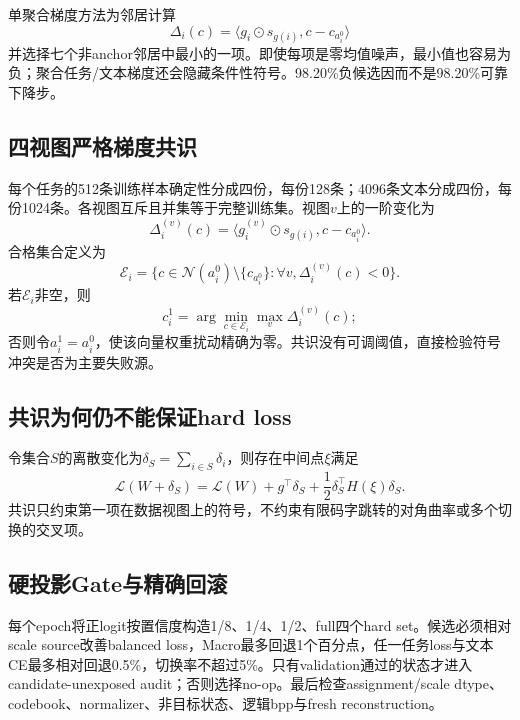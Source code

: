 单聚合梯度方法为邻居计算
\begin{equation}
\Delta_i(c)=\langle g_i\odot s_{g(i)},c-c_{a_i^0}\rangle
\end{equation}
并选择七个非anchor邻居中最小的一项。即使每项是零均值噪声，最小值也容易为负；聚合任务/文本梯度还会隐藏条件性符号。98.20\%负候选因而不是98.20\%可靠下降步。

\subsection{四视图严格梯度共识}

每个任务的512条训练样本确定性分成四份，每份128条；4096条文本分成四份，每份1024条。各视图互斥且并集等于完整训练集。视图$v$上的一阶变化为
\begin{equation}
\Delta_i^{(v)}(c)=\langle g_i^{(v)}\odot s_{g(i)},c-c_{a_i^0}\rangle.
\end{equation}
合格集合定义为
\begin{equation}
\mathcal E_i=\{c\in\mathcal N(a_i^0)\setminus\{c_{a_i^0}\}:\forall v,\Delta_i^{(v)}(c)<0\}.
\end{equation}
若$\mathcal E_i$非空，则
\begin{equation}
c_i^1=\arg\min_{c\in\mathcal E_i}\max_v\Delta_i^{(v)}(c);
\end{equation}
否则令$a_i^1=a_i^0$，使该向量权重扰动精确为零。共识没有可调阈值，直接检验符号冲突是否为主要失败源。

\subsection{共识为何仍不能保证hard loss}

令集合$S$的离散变化为$\delta_S=\sum_{i\in S}\delta_i$，则存在中间点$\xi$满足
\begin{equation}
\mathcal L(W+\delta_S)=\mathcal L(W)+g^\top\delta_S+
\frac12\delta_S^\top H(\xi)\delta_S.
\end{equation}
共识只约束第一项在数据视图上的符号，不约束有限码字跳转的对角曲率或多个切换的交叉项。

\subsection{硬投影Gate与精确回滚}

每个epoch将正logit按置信度构造1/8、1/4、1/2、full四个hard set。候选必须相对scale source改善balanced loss，Macro最多回退1个百分点，任一任务loss与文本CE最多相对回退0.5\%，切换率不超过5\%。只有validation通过的状态才进入candidate-unexposed audit；否则选择no-op。最后检查assignment/scale dtype、codebook、normalizer、非目标状态、逻辑bpp与fresh reconstruction。
